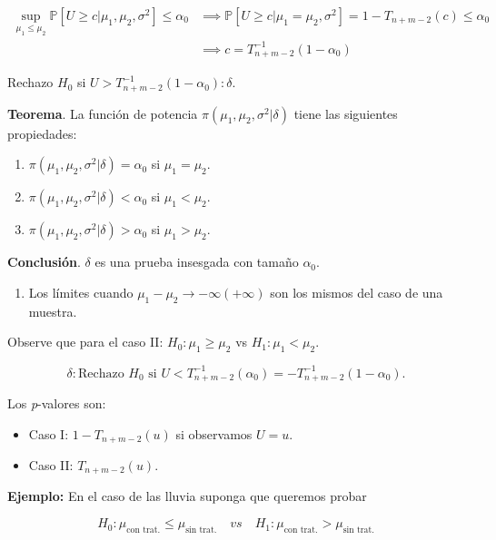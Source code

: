\documentclass[
  12pt,
]{book}
\providecommand{\tightlist}{%
  \setlength{\itemsep}{0pt}\setlength{\parskip}{0pt}}
\begin{document}
\begin{align*} \sup_{\mu_1\leq
\mu_2}\mathbb P[U\geq c|\mu_1,\mu_2,\sigma^2]\leq \alpha_0 & \implies 
\mathbb P[U\geq c|\mu_1=\mu_2,\sigma^2] = 1-T_{n+m-2}(c) \leq \alpha_0 \\ & \implies c =
T_{n+m-2}^{-1}(1-\alpha_0) 
\end{align*}

Rechazo \(H_0\) si \(U> T_{n+m-2}^{-1}(1-\alpha_0): \delta\).

\textbf{Teorema}. La función de potencia \(\pi(\mu_1,\mu_2,\sigma^2|\delta)\) tiene las
siguientes propiedades:

\begin{enumerate}
\def\labelenumi{\roman{enumi}.}
\item
  \(\pi(\mu_1,\mu_2,\sigma^2|\delta) = \alpha_0\) si \(\mu_1 = \mu_2\).
\item
  \(\pi(\mu_1,\mu_2,\sigma^2|\delta) < \alpha_0\) si \(\mu_1 < \mu_2\).
\item
  \(\pi(\mu_1,\mu_2,\sigma^2|\delta) > \alpha_0\) si \(\mu_1 > \mu_2\).
\end{enumerate}

\textbf{Conclusión}. \(\delta\) es una prueba insesgada con tamaño \(\alpha_0\).

\begin{enumerate}
\def\labelenumi{\roman{enumi}.}
\setcounter{enumi}{3}
\tightlist
\item
  Los límites cuando \(\mu_1-\mu_2\to -\infty (+\infty)\) son los mismos del caso de una muestra.
\end{enumerate}

Observe que para el caso II: \(H_0: \mu_1\geq\mu_2\) vs \(H_1: \mu_1<\mu_2\).

\[\delta: \text{Rechazo } H_0 \text{ si } U<T^{-1}_{n+m-2}(\alpha_0) = -T_{n+m-2}^{-1}(1-\alpha_0).\]

Los \emph{p}-valores son:

\begin{itemize}
\item
  Caso I: \(1-T_{n+m-2}(u)\) si observamos \(U = u\).
\item
  Caso II: \(T_{n+m-2}(u)\).
\end{itemize}

\textbf{Ejemplo:} En el caso de las lluvia suponga que queremos probar

\[
H_0: \mu_{\text{con trat.}} \leq \mu_{\text{sin trat.}} \quad
vs \quad
H_1: \mu_{\text{con trat.}} > \mu_{\text{sin trat.}} 
\]
\end{document}
